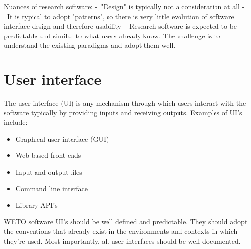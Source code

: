 \documentclass[]{nrel}
\begin{document}
Nuances of research software:
- "Design" is typically not a consideration at all
- It is typical to adopt "patterns", so there is very little evolution of software interface design and therefore usability
- Research software is expected to be predictable and similar to what users already know. The challenge is to understand the existing paradigms and adopt them well.


\section{User interface}
The user interface (UI) is any mechanism through which users interact with the software
typically by providing inputs and receiving outputs. Examples of UI’s include:
\begin{itemize}
\item Graphical user interface (GUI)

\item Web-based front ends

\item Input and output files

\item Command line interface

\item Library API’s

\end{itemize}

WETO software UI’s should be well defined and predictable.
They should adopt the conventions that already exist in the environments and contexts
in which they’re used.
Most importantly, all user interfaces should be well documented.
\end{document}
